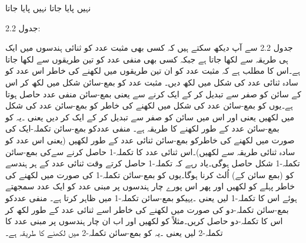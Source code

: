  






 
نہیں پایا جاتا
نہیں پایا جاتا

جدول 2.2:

	جدول 2.2 سے آپ دیکھ سکتے ہیں کہ کسی بھی مثبت عدد کو ثنائی ہندسوں میں ایک ہی طریقہ سے لکھا جاتا ہے جبکہ کسی بھی منفی عدد کو تین طریقوں سے لکھا جاتا ہے۔اس کا مطلب ہے کہ مثبت عدد کو ان تین طریقوں میں لکھنے کی خاطر اس عدد کو سادہ ثنائی عدد کی شکل میں لکھ دیں۔ 
	مثبت عدد  کو بمع-سائن شکل میں لکھ کر اس کے سائن کو صفر  سے تبدیل کر کے ایک  کرنے سے یعنی بمع-سائن منفی عدد حاصل ہوتا ہے۔یوں کو بمع-سائن عدد کی شکل میں لکھنے کی خاطر کو بمع-سائن عدد کی شکل میں لکھیں یعنی اور اس میں سائن کو صفر سے تبدیل کر کے ایک کر دیں یعنی ۔یہ کو بمع-سائن عدد کے طور لکھنے کا طریقہ ہے۔
	منفی عددکو بمع-سائن تکملہ-ایک کی صورت میں لکھنے کی خاطرکو بمع-سائن ثنائی عدد کے طور لکھیں (یعنی اس عدد کو سادہ ثنائی طریقہ سے لکھیں)۔اس ثنائی عدد کا تکملہ-1 حاصل کرنے سےکی بمع-سائن تکملہ-1 شکل حاصل ہوگی۔یاد رہے کہ تکملہ-1 حاصل کرتے وقت ثنائی عدد کے ہر ہندسے کو (بمع سائن کے)  اُلٹ کرنا ہوگا۔یوں کو بمع-سائن تکملہ-1 کی صورت میں لکھنے کی خاطر پہلے کو لکھیں اور پھر اس پورے چار ہندسوں پر مبنی عدد کو ایک عدد سمجھتے ہوئے اس کا تکملہ-1 لیں یعنی ۔یہیکو بمع-سائن تکملہ-1 میں ظاہر کرتا ہے۔
	منفی عددکو بمع-سائن تکملہ-دو کی صورت میں لکھنے کی خاطر اسے ثنائی عدد کے طور لکھ کر اس کا تکملہ-دو حاصل کریں۔مثلاً کو لکھیں اور اب ان چار ہندسوں پر مبنی عدد کا تکملہ-2 لیں یعنی ۔یہ کو بمع-سائن تکملہ-2 میں لکھنے کا طریقہ ہے۔
